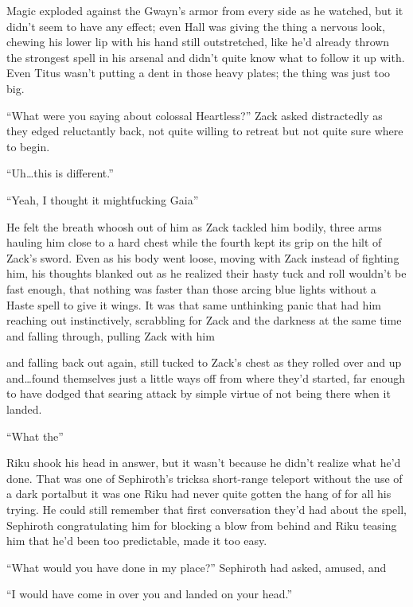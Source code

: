 Magic exploded against the Gwayn's armor from every side as he watched, but it didn't seem to have any effect; even Hall was giving the thing a nervous look, chewing his lower lip with his hand still outstretched, like he'd already thrown the strongest spell in his arsenal and didn't quite know what to follow it up with. Even Titus wasn't putting a dent in those heavy plates; the thing was just too big.

``What were you saying about colossal Heartless?'' Zack asked distractedly as they edged reluctantly back, not quite willing to retreat but not quite sure where to begin.

``Uh\ldots this is different.''

``Yeah, I thought it might\textemdash fucking Gaia\textemdash ''

He felt the breath whoosh out of him as Zack tackled him bodily, three arms hauling him close to a hard chest while the fourth kept its grip on the hilt of Zack's sword. Even as his body went loose, moving with Zack instead of fighting him, his thoughts blanked out as he realized their hasty tuck and roll wouldn't be fast enough, that nothing was faster than those arcing blue lights without a Haste spell to give it wings. It was that same unthinking panic that had him reaching out instinctively, scrabbling for Zack and the darkness at the same time and falling through, pulling Zack with him\textemdash 

\textemdash and falling back out again, still tucked to Zack's chest as they rolled over and up and\ldots found themselves just a little ways off from where they'd started, far enough to have dodged that searing attack by simple virtue of not being there when it landed.

``What the\textemdash ''

Riku shook his head in answer, but it wasn't because he didn't realize what he'd done. That was one of Sephiroth's tricks\textemdash a short-range teleport without the use of a dark portal\textemdash but it was one Riku had never quite gotten the hang of for all his trying. He could still remember that first conversation they'd had about the spell, Sephiroth congratulating him for blocking a blow from behind and Riku teasing him that he'd been too predictable, made it too easy.

``What would you have done in my place?'' Sephiroth had asked, amused, and\textemdash 

``I would have come in over you and landed on your head.''

